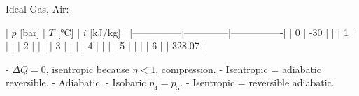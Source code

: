 Ideal Gas, Air:  

| \( p \) [bar] | \( T \) [°C] | \( i \) [kJ/kg] |  
|---------------|--------------|----------------|  
| 0             | -30          |                |  
| 1             |              |                |  
| 2             |              |                |  
| 3             |              |                |  
| 4             |              |                |  
| 5             |              |                |  
| 6             |              | 328.07         |  

- \( \Delta Q = 0 \), isentropic because \( \eta < 1 \), compression.  
- Isentropic = adiabatic reversible.  
- Adiabatic.  
- Isobaric \( p_4 = p_5 \).  
- Isentropic = reversible adiabatic.